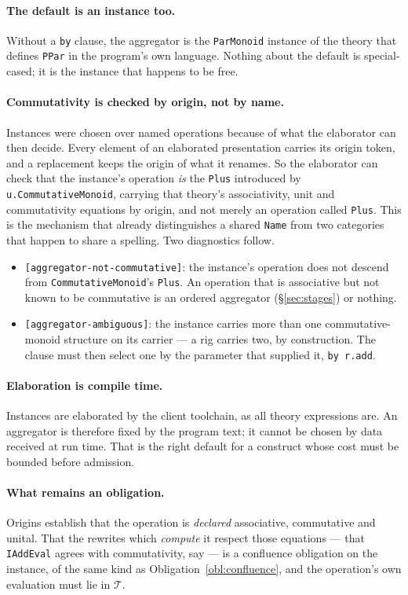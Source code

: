 \documentclass[11pt]{article}
\theoremstyle{definition}
\theoremstyle{plain}
\theoremstyle{remark}
\begin{document}
\paragraph{The default is an instance too.} Without a \texttt{by} clause, the
aggregator is the \texttt{ParMonoid} instance of the theory that defines
\texttt{PPar} in the program's own language. Nothing about the default is
special-cased; it is the instance that happens to be free.

\paragraph{Commutativity is checked by origin, not by name.} Instances were
chosen over named operations because of what the elaborator can then decide.
Every element of an elaborated presentation carries its origin token, and a
replacement keeps the origin of what it renames. So the elaborator can check
that the instance's operation \emph{is} the \texttt{Plus} introduced by
\texttt{u.CommutativeMonoid}, carrying that theory's associativity, unit and
commutativity equations by origin, and not merely an operation called
\texttt{Plus}. This is the mechanism that already distinguishes a shared
\texttt{Name} from two categories that happen to share a spelling. Two
diagnostics follow.
\begin{itemize}[nosep]
\item \texttt{[aggregator-not-commutative]}: the instance's operation does not
descend from \texttt{CommutativeMonoid}'s \texttt{Plus}. An operation that is
associative but not known to be commutative is an ordered aggregator
(\S\ref{sec:stages}) or nothing.
\item \texttt{[aggregator-ambiguous]}: the instance carries more than one
commutative-monoid structure on its carrier --- a rig carries two, by
construction. The clause must then select one by the parameter that supplied it,
\texttt{by r.add}.
\end{itemize}

\paragraph{Elaboration is compile time.} Instances are elaborated by the client
toolchain, as all theory expressions are. An aggregator is therefore fixed by
the program text; it cannot be chosen by data received at run time. That is the
right default for a construct whose cost must be bounded before admission.

\paragraph{What remains an obligation.} Origins establish that the operation is
\emph{declared} associative, commutative and unital. That the rewrites which
\emph{compute} it respect those equations --- that \texttt{IAddEval} agrees with
commutativity, say --- is a confluence obligation on the instance, of the same
kind as Obligation~\ref{obl:confluence}, and the operation's own evaluation must
lie in \(\mathcal{T}\).
\end{document}
